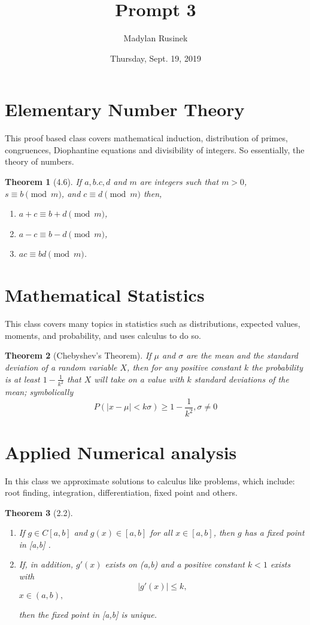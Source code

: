 \documentclass [12pt]{article}
\title{Prompt 3}
\author{Madylan Rusinek}
\date{Thursday, Sept. 19, 2019}
\newtheorem{thm*}{Theorem}
\begin{document}
\maketitle
\newpage
\section{Elementary Number Theory}
This proof based class covers mathematical induction, distribution of primes, %
congruences, Diophantine equations and divisibility of integers. So essentially, the theory of numbers.
\begin{thm*}[4.6]
If \(a,b.c,d\) and \(m\) are integers such that \(m>0\), \(s \equiv b\pmod{m}\), and \( c \equiv d\pmod{m} \) then,
\begin{centering}
\begin{enumerate}
\item \(a + c \equiv b + d\pmod{m}\),
\item\( a - c\equiv b - d\pmod{m}\),
\item \({ac}\equiv {bd}\pmod{m}\).
\end{enumerate}
\end{centering}
\end{thm*}
\section{Mathematical Statistics}
This class covers many topics in statistics such as distributions, expected values, moments, and probability, and uses calculus to do so.  
\begin{thm*}[Chebyshev's Theorem]
If \(\mu\) and \(\sigma\) are the mean and the standard deviation of a random variable \(X\), then for any positive constant \(k\) the probability is \emph{at least}
 \(1- \frac{1}{k^2}\) that \(X\) will take on a value with \(k\) standard deviations of the mean; symbolically
 \[P(|x-\mu| < k\sigma) \geq 1 - \frac{1}{k^2},\sigma \neq 0\] 
\end{thm*}
\section{Applied Numerical analysis}
In this class we approximate solutions to calculus like problems, which include: root finding, integration, differentiation, fixed point and others.
\begin{thm*}[2.2]
\begin{enumerate}
\item If \(g \in C[a,b]\) and \(g(x) \in [a,b]\) for all \( x \in [a,b]\), then \(g\) has a fixed point in [a,b] .
\item If, in addition, \(g'(x)\) exists on (a,b) and a positive constant \(k < 1\) exists with
 \[|g'(x)| \leq k,\] \(x \in (a,b), \)

then the fixed point in [a,b] is unique.
\end{enumerate}
\end{thm*}
\end{document}
